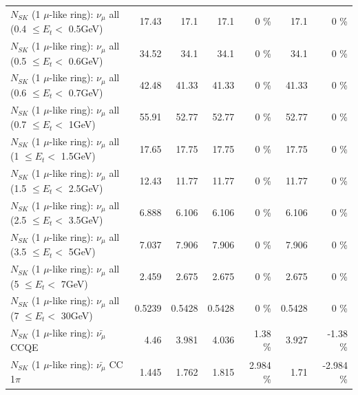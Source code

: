 \begin{table}
\begin{tabular}{| l | r | r | r  r | r  r |}
       $N_{SK}$ (1 $\mu$-like ring): $\nu_{\mu}$ all (0.4 $\leq E_{t} <$ 0.5GeV) &           17.43 &            17.1 &            17.1 &        0 \%  &            17.1 &        0 \%  \\ 
       $N_{SK}$ (1 $\mu$-like ring): $\nu_{\mu}$ all (0.5 $\leq E_{t} <$ 0.6GeV) &           34.52 &            34.1 &            34.1 &        0 \%  &            34.1 &        0 \%  \\ 
       $N_{SK}$ (1 $\mu$-like ring): $\nu_{\mu}$ all (0.6 $\leq E_{t} <$ 0.7GeV) &           42.48 &           41.33 &           41.33 &        0 \%  &           41.33 &        0 \%  \\ 
         $N_{SK}$ (1 $\mu$-like ring): $\nu_{\mu}$ all (0.7 $\leq E_{t} <$ 1GeV) &           55.91 &           52.77 &           52.77 &        0 \%  &           52.77 &        0 \%  \\ 
         $N_{SK}$ (1 $\mu$-like ring): $\nu_{\mu}$ all (1 $\leq E_{t} <$ 1.5GeV) &           17.65 &           17.75 &           17.75 &        0 \%  &           17.75 &        0 \%  \\ 
       $N_{SK}$ (1 $\mu$-like ring): $\nu_{\mu}$ all (1.5 $\leq E_{t} <$ 2.5GeV) &           12.43 &           11.77 &           11.77 &        0 \%  &           11.77 &        0 \%  \\ 
       $N_{SK}$ (1 $\mu$-like ring): $\nu_{\mu}$ all (2.5 $\leq E_{t} <$ 3.5GeV) &           6.888 &           6.106 &           6.106 &        0 \%  &           6.106 &        0 \%  \\ 
         $N_{SK}$ (1 $\mu$-like ring): $\nu_{\mu}$ all (3.5 $\leq E_{t} <$ 5GeV) &           7.037 &           7.906 &           7.906 &        0 \%  &           7.906 &        0 \%  \\ 
           $N_{SK}$ (1 $\mu$-like ring): $\nu_{\mu}$ all (5 $\leq E_{t} <$ 7GeV) &           2.459 &           2.675 &           2.675 &        0 \%  &           2.675 &        0 \%  \\ 
          $N_{SK}$ (1 $\mu$-like ring): $\nu_{\mu}$ all (7 $\leq E_{t} <$ 30GeV) &          0.5239 &          0.5428 &          0.5428 &        0 \%  &          0.5428 &        0 \%  \\ 
\hline
\hline
\hline
                              $N_{SK}$ (1 $\mu$-like ring): $\bar{\nu_\mu}$ CCQE &            4.46 &           3.981 &           4.036 &     1.38 \%  &           3.927 &    -1.38 \%  \\ 
                         $N_{SK}$ (1 $\mu$-like ring): $\bar{\nu_\mu}$ CC 1$\pi$ &           1.445 &           1.762 &           1.815 &    2.984 \%  &            1.71 &   -2.984 \%  \\ 

\end{tabular}
\end{table}
